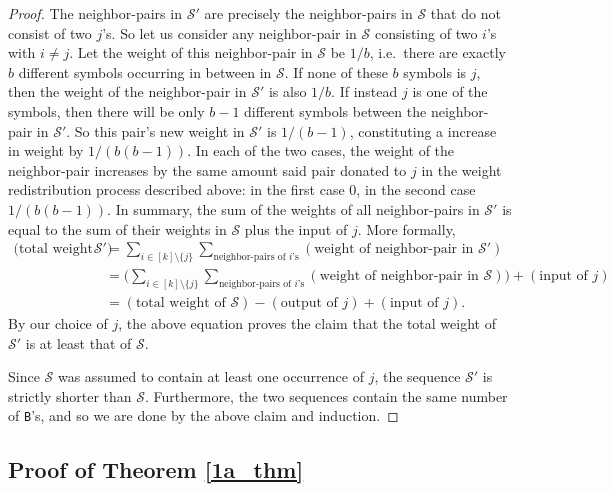 \documentclass[11pt,reqno]{amsart} %
\numberwithin{equation}{section}
\newcommand{\eq}[1]{\begin{align*} #1 \end{align*}}
\newcommand{\s}{\mathcal{S}}
\theoremstyle{definition}
\begin{document}
\begin{proof}
The neighbor-pairs in $\s'$ are precisely the neighbor-pairs in $\s$ that do not consist of two $j$'s.  So let us consider any neighbor-pair in $\s$ consisting of two $i$'s with $i\neq j$. 
Let the weight of this neighbor-pair in $\s$ be $1/b$, i.e.~there are exactly $b$ different symbols occurring in between in $\s$. 
If none of these $b$ symbols is $j$, then the weight of the neighbor-pair in $\s'$ is also $1/b$. 
If instead $j$ is one of the symbols, then there will be only $b-1$ different symbols between the neighbor-pair in $\s'$.
So this pair's new weight in $\s'$ is $1/(b-1)$, constituting a increase in weight by $1/(b(b-1))$.
In each of the two cases, the weight of the neighbor-pair increases by the same amount said pair donated to $j$ in the weight redistribution process described above: in the first case $0$, in the second case $1/(b(b-1))$.
In summary, the sum of the weights of all neighbor-pairs in $\s'$ is equal to the sum of their weights in $\s$ plus the input of $j$.
More formally,
\eq{
\text{(total weight of $\s'$)} 
&= \sum_{i\in[k]\setminus\{j\}}\sum_{\text{neighbor-pairs of $i$'s}} (\text{weight of neighbor-pair in $\s'$}) \\
&=  \bigg(\sum_{i\in[k]\setminus\{j\}}\sum_{\text{neighbor-pairs of $i$'s}} (\text{weight of neighbor-pair in $\s$})\bigg) + (\text{input of $j$}) \\
&= (\text{total weight of $\s$}) - (\text{output of $j$}) + (\text{input of $j$}).
}
By our choice of $j$, the above equation proves the claim that the total weight of $\s'$ is at least that of $\s$. 

Since $\s$ was assumed to contain at least one occurrence of $j$, the sequence $\s'$ is strictly shorter than $\s$. 
Furthermore, the two sequences contain the same number of \texttt{B}'s, and so we are done by the above claim and induction.
\end{proof}


\subsection{Proof of Theorem \ref{1a_thm}}
\end{document}
